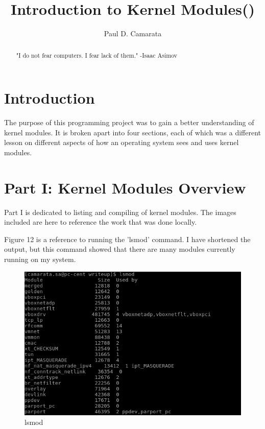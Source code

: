 \documentclass[10pt]{article}
\begin{document}
\title{Introduction to Kernel Modules()}
\author{Paul D. Camarata}

\maketitle
\pagebreak
\begin{abstract}
"I do not fear computers. I fear lack of them."
-Isaac Asimov
\end{abstract}

\section{Introduction}
The purpose of this programming project was to gain a better understanding of kernel modules.  It is broken apart into four sections, each of which was a different lesson on different aspects of how an operating system sees and uses kernel modules.

\section{Part I: Kernel Modules Overview}
Part I is dedicated to listing and compiling of kernel modules.  The images included are here to reference the work that was done locally.

Figure 12 is a reference to running the 'lsmod' command.  I have shortened the output, but this command showed that there are many modules currently running on my system.

\begin{figure}[!h]
\centering
\includegraphics[scale=0.5]{./images/ss1.png}
\caption{lsmod}
\label{fig:Code}
\end{figure}
\end{document}
